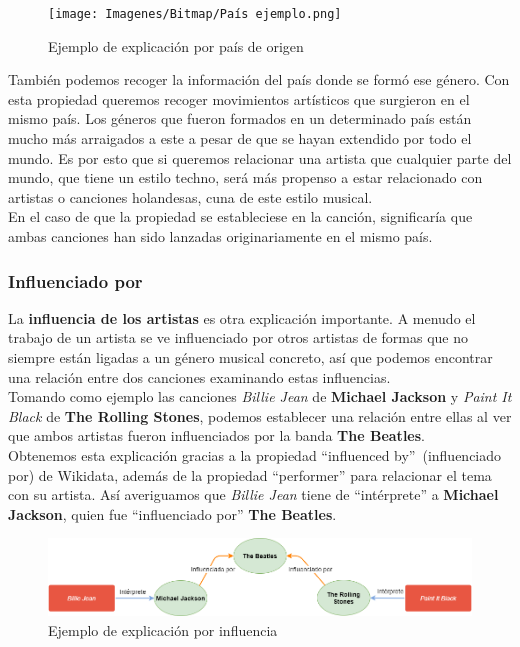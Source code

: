 \begin{figure}[h!]
	\centering
	\texttt{[image: Imagenes/Bitmap/País ejemplo.png]}
	\caption{Ejemplo de explicación por país de origen}
	\label{fig:sampleImage}
\end{figure}

También podemos recoger la información del país donde se formó ese género. Con esta propiedad queremos recoger movimientos artísticos que surgieron en el mismo país. Los géneros que fueron formados en un determinado país están mucho más arraigados a este a pesar de que se hayan extendido por todo el mundo. Es por esto que si queremos relacionar una artista que cualquier parte del mundo, que tiene un estilo techno, será más propenso a estar relacionado con artistas o canciones holandesas, cuna de este estilo musical.\\

En el caso de que la propiedad se estableciese en la canción, significaría que ambas canciones han sido lanzadas originariamente en el mismo país.\\

\subsubsection*{Influenciado por}

La \textbf{influencia de los artistas} es otra explicación importante. A menudo el trabajo de un artista se ve influenciado por otros artistas de formas que no siempre están ligadas a un género musical concreto, así que podemos encontrar una relación entre dos canciones examinando estas influencias.\\

Tomando como ejemplo las canciones \textit{Billie Jean} de \textbf{Michael Jackson} y \textit{Paint It Black} de \textbf{The Rolling Stones}, podemos establecer una relación entre ellas al ver que ambos artistas fueron influenciados por la banda \textbf{The Beatles}.\\

Obtenemos esta explicación gracias a la propiedad ``influenced by''~(influenciado por) de Wikidata, además de la propiedad ``performer'' para relacionar el tema con su artista. Así averiguamos que \textit{Billie Jean} tiene de ``intérprete'' a \textbf{Michael Jackson}, quien fue ``influenciado por'' \textbf{The Beatles}.\\

\begin{figure}[h!]
	\centering
	\includegraphics[width = 1\textwidth]{Imagenes/Bitmap/Influencia ejemplo.png}
	\caption{Ejemplo de explicación por influencia}
	\label{fig:sampleImage}
\end{figure}

